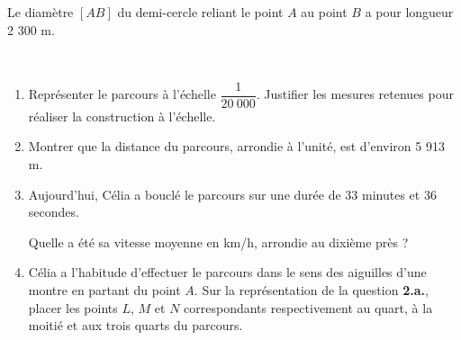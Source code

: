 \begin{enumerate}
    \begin{minipage}{5cm}
        Le diamètre $[AB]$ du demi-cercle reliant le point $A$ au point $B$ a pour longueur 2 300 m.
    \end{minipage}
     \hspace{1cm}
    \begin{minipage}{10cm}
    \end{minipage}
    \medskip
    \begin{enumerate}
        \item Représenter le parcours à l’échelle $\dfrac{1}{20~000}$. Justifier les mesures retenues pour réaliser
        la construction à l’échelle.
        \item Montrer que la distance du parcours, arrondie à l’unité, est d’environ 5 913 m.
        \item Aujourd’hui, Célia a bouclé le parcours sur une durée de 33 minutes et 36 secondes.
                
        Quelle a été sa vitesse moyenne en km/h, arrondie au dixième près ?
        \item Célia a l'habitude d'effectuer le parcours dans le sens des aiguilles d'une montre en
        partant du point $A$. Sur la représentation de la question \textbf{2.a.}, placer les points $L$, $M$ et
        $N$ correspondants respectivement au quart, à la moitié et aux trois quarts du parcours.
    \end{enumerate}
\end{enumerate}